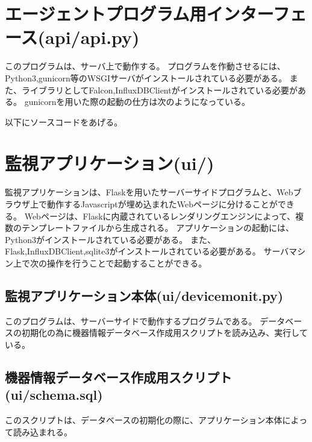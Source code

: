 \section*{エージェントプログラム用インターフェース(api/api.py)}
このプログラムは、サーバ上で動作する。
プログラムを作動させるには、Python3,gunicorn等のWSGIサーバがインストールされている必要がある。
また、ライブラリとしてFalcon,InfluxDBClientがインストールされている必要がある。
gunicornを用いた際の起動の仕方は次のようになっている。

以下にソースコードをあげる。


\section*{監視アプリケーション(ui/)}
監視アプリケーションは、Flaskを用いたサーバーサイドプログラムと、Webブラウザ上で動作するJavascriptが埋め込まれたWebページに分けることができる。
Webページは、Flaskに内蔵されているレンダリングエンジンによって、複数のテンプレートファイルから生成される。
アプリケーションの起動には、Python3がインストールされている必要がある。
また、Flask,InfluxDBClient,sqlite3がインストールされている必要がある。
サーバマシン上で次の操作を行うことで起動することができる。

\subsection*{監視アプリケーション本体(ui/devicemonit.py)}
このプログラムは、サーバーサイドで動作するプログラムである。
データベースの初期化の為に機器情報データベース作成用スクリプトを読み込み、実行している。


\subsection*{機器情報データベース作成用スクリプト(ui/schema.sql)}
このスクリプトは、データベースの初期化の際に、アプリケーション本体によって読み込まれる。



